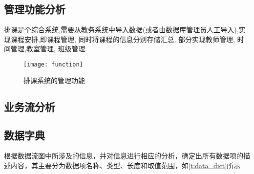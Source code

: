 \documentclass{myreport}
\begin{document}
  \subsection{管理功能分析}
    排课是个综合系统,需要从教务系统中导入数据(或者由数据库管理员人工导入),实现课程安排,即课程管理, 同时将课程的信息分别存储汇总, 部分实现教师管理, 时间管理,教室管理, 班级管理.
    \begin{figure}[H]
      \centering
      \texttt{[image: function]}
      \caption{排课系统的管理功能}
      \label{fig:function}
    \end{figure}

  \subsection{业务流分析}

  \subsection{数据字典}
    根据数据流图中所涉及的信息，并对信息进行相应的分析，确定出所有数据项的描述内容，其主要分为数据项名称、类型、长度和取值范围，如\cref{t:data_dict}所示
\end{document}

